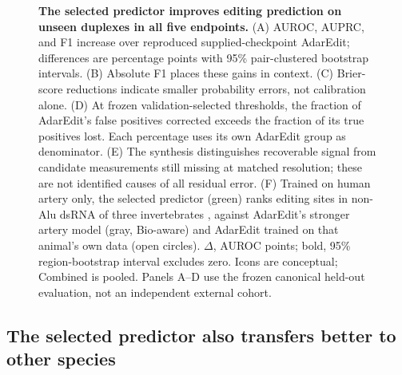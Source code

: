 \documentclass[9pt,twocolumn,twoside]{pnas-new}
\begin{document}
\begin{figure}[t!]
\centering

\caption{\textbf{The selected predictor improves editing prediction on unseen duplexes in all five endpoints.} (A) AUROC, AUPRC, and F1 increase over reproduced supplied-checkpoint AdarEdit; differences are percentage points with 95\% pair-clustered bootstrap intervals. (B) Absolute F1 places these gains in context. (C) Brier-score reductions indicate smaller probability errors, not calibration alone. (D) At frozen validation-selected thresholds, the fraction of AdarEdit's false positives corrected exceeds the fraction of its true positives lost. Each percentage uses its own AdarEdit group as denominator. (E) The synthesis distinguishes recoverable signal from candidate measurements still missing at matched resolution; these are not identified causes of all residual error. (F) Trained on human artery only, the selected predictor (green) ranks editing sites in non-Alu dsRNA of three invertebrates \cite{Rosenwasser2026AdarEdit}, against AdarEdit's stronger artery model (gray, Bio-aware) and AdarEdit trained on that animal's own data (open circles). $\Delta$, AUROC points; bold, 95\% region-bootstrap interval excludes zero. Icons are conceptual; Combined is pooled. Panels A--D use the frozen canonical held-out evaluation, not an independent external cohort.}
\label{fig:locked}
\end{figure}

\subsection*{The selected predictor also transfers better to other species}
\end{document}

